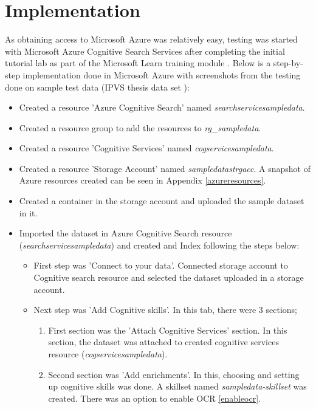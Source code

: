 \section {Implementation}  %
\label{section:impl}
As obtaining access to Microsoft Azure was relatively easy, testing was started with Microsoft Azure Cognitive Search Services \cite{azdocs} after completing the initial tutorial lab as part of the Microsoft Learn training module \cite{azuretutorial}.
Below is a step-by-step implementation done in Microsoft Azure with screenshots from the testing done on sample test data (\acs{IPVS} thesis data set \cite{thesispublications}):
\begin{itemize}
    \item Created a resource 'Azure Cognitive Search' named \textit{searchservicesampledata}.
    \item Created a resource group to add the resources to \textit{rg\_sampledata}.
    \item Created a resource 'Cognitive Services' named \textit{cogservicesampledata}.
    \item Created a resource 'Storage Account' named \textit{sampledatastrgacc}. A snapshot of Azure resources created can be seen in Appendix \ref{azureresources}.
    \item Created a container in the storage account and uploaded the sample dataset in it.
    \item Imported the dataset in Azure Cognitive Search resource (\textit{searchservicesampledata}) and created and Index following the steps below:
    \begin{itemize}
        \item First step was 'Connect to your data'. Connected storage account to Cognitive search resource and selected the dataset uploaded in a storage account.
        \item Next step was 'Add Cognitive skills'. 
        In this tab, there were 3 sections; 
        \begin{enumerate}
            \item First section was the 'Attach Cognitive Services' section. In this section, the dataset was attached to created cognitive services resource (\textit{cogservicesampledata}).
            \item Second section was 'Add enrichments'. In this, choosing and setting up cognitive skills was done. A skillset named \textit{sampledata-skillset} was created. There was an option to enable OCR \ref{enableocr}. 
            \begin {figure}[ht]

\end{figure}
\end{enumerate}
\end{itemize}
\end{itemize}
